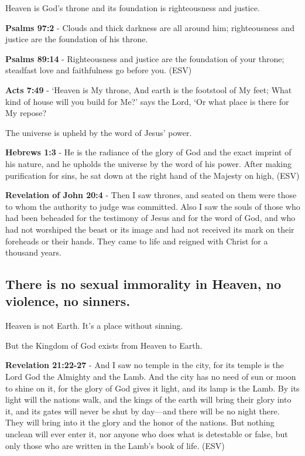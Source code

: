 \documentclass[11pt]{article}
\begin{document}
Heaven is God's throne and its foundation is righteousness and justice.

\textbf{Psalms 97:2} - Clouds and thick darkness are all around him; righteousness and justice are the foundation of his throne.

\textbf{Psalms 89:14} - Righteousness and justice are the foundation of your throne; steadfast love and faithfulness go before you. (ESV)

\textbf{Acts 7:49} - ‘Heaven is My throne, And earth is the footstool of My feet; What kind of house will you build for Me?’ says the Lord, ‘Or what place is there for My repose?

The universe is upheld by the word of Jesus' power.

\textbf{Hebrews 1:3} - He is the radiance of the glory of God and the exact imprint of his nature, and he upholds the universe by the word of his power. After making purification for sins, he sat down at the right hand of the Majesty on high, (ESV)

\textbf{Revelation of John 20:4} - Then I saw thrones, and seated on them were those to whom the authority to judge was committed. Also I saw the souls of those who had been beheaded for the testimony of Jesus and for the word of God, and who had not worshiped the beast or its image and had not received its mark on their foreheads or their hands. They came to life and reigned with Christ for a thousand years.

\subsection{There is no sexual immorality in Heaven, no violence, no sinners.}
\label{sec:org7296e70}
Heaven is not Earth. It's a place without sinning.

But the Kingdom of God exists from Heaven to Earth.

\textbf{Revelation 21:22-27} - And I saw no temple in the city, for its temple is the Lord God the Almighty and the Lamb. And the city has no need of sun or moon to shine on it, for the glory of God gives it light, and its lamp is the Lamb. By its light will the nations walk, and the kings of the earth will bring their glory into it, and its gates will never be shut by day—and there will be no night there. They will bring into it the glory and the honor of the nations. But nothing unclean will ever enter it, nor anyone who does what is detestable or false, but only those who are written in the Lamb's book of life. (ESV)
\end{document}
